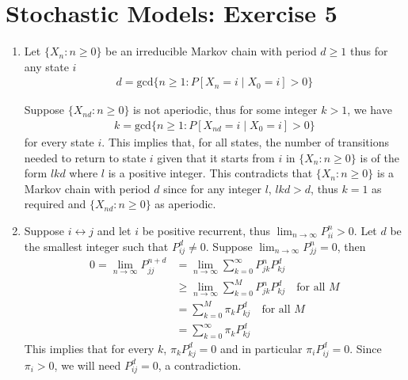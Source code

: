 \documentclass[a4paper,10pt]{article}
\theoremstyle{definition}
\begin{document}
\section*{Stochastic Models: Exercise 5}

\begin{enumerate}
\item Let $\{X_n: n\geq 0\}$ be an irreducible Markov chain with period $d \geq 1$ thus for any state $i$
\begin{align*}
d=\text{gcd}\{n\geq 1: P\left[X_n=i\mid X_0=i\right]>0\}
\end{align*}


Suppose $\{X_{nd}:n\geq 0\}$ is not aperiodic, thus for some integer $k>1$, we have
\begin{align*}  
k=\text{gcd}\{n\geq 1: P\left[X_{nd}=i\mid X_0=i\right]>0\}
\end{align*}
for every state $i$. This implies that, for all states, the number of transitions needed to return to state $i$ given that it starts from $i$ in $\{X_n: n\geq 0\}$ is of the form $lkd$ where $l$ is a positive integer. This contradicts that $\{X_n: n\geq 0\}$ is a Markov chain with period $d$ since for any integer $l$, $lkd>d$, thus $k=1$ as required and $\{X_{nd}: n\geq 0\}$ as aperiodic.


\item Suppose $i \leftrightarrow j$ and let $i$ be positive recurrent, thus $\lim_{n\to\infty}P^n_{ii}>0$. Let $d$ be the smallest integer such that $P^d_{ij}\neq 0$. Suppose $\lim_{n\to\infty}P^n_{jj}=0$, then
\begin{align*}
0=\lim_{n\to\infty}P^{n+d}_{jj}&=\lim_{n\to\infty}\sum_{k=0}^{\infty}P^n_{jk}P^d_{kj}\\
&\geq\lim_{n\to\infty}\sum_{k=0}^{M}P^n_{jk}P^d_{kj} \quad \text{for all $M$}\\
&=\sum_{k=0}^{M}\pi_{k}P^d_{kj} \quad \text{for all $M$}\\
&=\sum_{k=0}^{\infty}\pi_{k}P^d_{kj} 
\end{align*}
This implies that for every $k$, $\pi_kP^d_{kj}=0$ and in particular $\pi_iP^d_{ij}=0$. Since $\pi_i >0$, we will need $P^d_{ij}=0$, a contradiction.


\end{enumerate}
\end{document}
